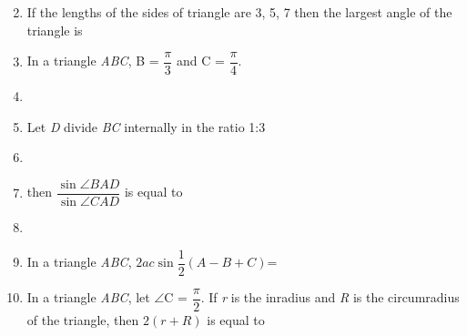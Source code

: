 \documentclass[journal,12pt,twocolumn]{IEEEtran}
\begin{document}
\begin{enumerate}
\begin{itemize}
\begin{multicols}{4}
 \end{multicols}
 \end{itemize}
 \item If the lengths of the sides of triangle are 3, 5, 7 then the largest angle of the triangle is
 \begin{itemize}
 \end{itemize}
 \item In a triangle \textsl{ABC}, \angle B = $\dfrac{\pi}{3}$ and \angle C = $\dfrac{\pi}{4}$. \item[~]\item[~]
 Let \textsl{D} divide \textsl{BC} internally in the ratio 1:3 \item[~]\item[~]then $\dfrac{\sin \angle BAD}{\sin \angle CAD}$ is equal to\item[~]
 \begin{itemize}
 \end{itemize}
 \item In a triangle \textsl{ABC}, $2ac\sin\dfrac{1}{2}\left(A-B+C\right)$=
 \begin{itemize}
 \end{itemize}
 \item In a triangle \textsl{ABC}, let $\angle$C = $\dfrac{\pi}{2}$. If \textsl{r} is the inradius and \textsl{R} is the circumradius of the triangle, then $2\left(r+R\right)$ is equal to

\end{enumerate}
\end{document}
